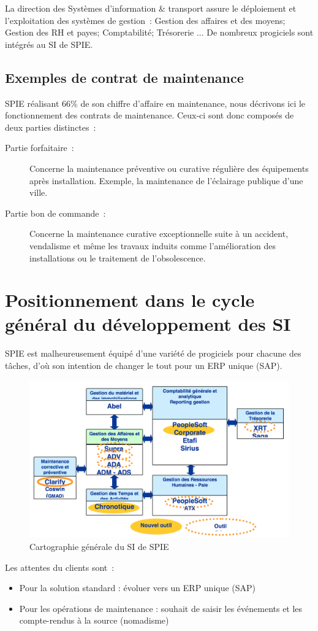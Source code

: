 La direction des Systèmes d’information \& transport assure le déploiement et l’exploitation des systèmes de
gestion~: Gestion des affaires et des moyens; Gestion des RH et payes; Comptabilité; Trésorerie ... De nombreux
progiciels sont intégrés au SI de SPIE.

\subsection{Exemples de contrat de maintenance}

SPIE réalisant 66\% de son chiffre d'affaire en maintenance, nous décrivons ici le fonctionnement des contrats de
maintenance. Ceux-ci sont donc composés de deux parties distinctes~:

\begin{description}
    \item[Partie forfaitaire~:] Concerne la maintenance préventive ou curative régulière des équipements
    après installation. Exemple, la maintenance de l'éclairage publique d'une ville.

    \item[Partie bon de commande~:] Concerne la maintenance curative exceptionnelle suite à un accident, vendalisme et
    même les travaux induits comme l'amélioration des installations ou le traitement de l’obsolescence.
\end{description}


\pagebreak
\section{Positionnement dans le cycle général du développement des SI}

SPIE est malheureusement équipé d'une variété de progiciels pour chacune des tâches, d'où son intention
de changer le tout pour un ERP unique (SAP).

\begin{figure}[h]
    \centering
    \includegraphics[width=140mm]{./images/A_SI_actuelles.png}
    \caption{Cartographie générale du SI de SPIE}
    \label{diagram:si_map}
\end{figure}

Les attentes du clients sont~:

\begin{itemize}
    \item Pour la solution standard : évoluer vers un ERP unique (SAP)
    \item Pour les opérations de maintenance : souhait de saisir les événements et les compte-rendus à la
    source (nomadisme)
\end{itemize}

